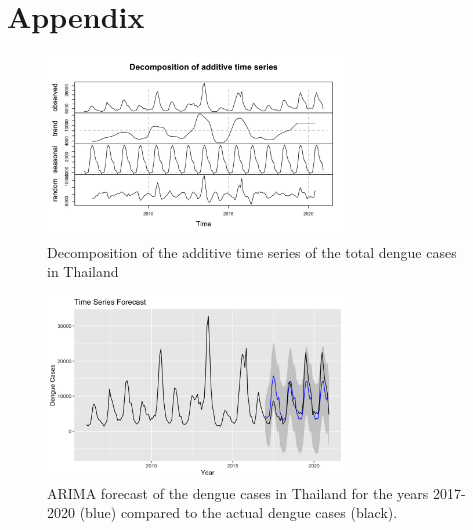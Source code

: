 \documentclass[parskip]{scrartcl}
\begin{document}


\newpage
\section{Appendix}

\begin{figure}[htbp] 
	\centering
	\includegraphics[width=0.7\textwidth]{fig/Decomposition_of_add_ts.png}
	\caption{ Decomposition of the additive time series of the total dengue cases in Thailand}
	\label{fig:decomp_ts_dengue}
\end{figure}


	\begin{figure}[hbpt] 
	\centering
	\includegraphics[width=0.7\textwidth]{fig/Auto_ARIMA_2016.png}
	\caption{ARIMA forecast of the dengue cases in Thailand for the years 2017-2020 (blue) compared to the actual dengue cases (black).}
	\label{fig:Auto_ARIMA_2016}
\end{figure}
\end{document}
